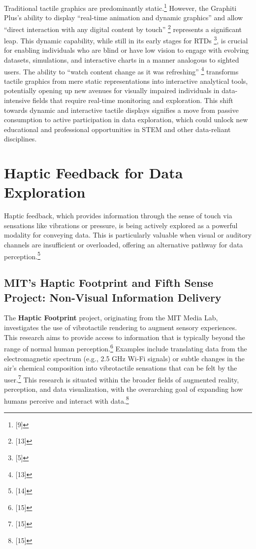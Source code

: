 Traditional tactile graphics are predominantly static.\footnote{[9]} However, the Graphiti Plus's ability to display ``real-time animation and dynamic graphics'' and allow ``direct interaction with any digital content by touch'' \footnote{[13]} represents a significant leap. This dynamic capability, while still in its early stages for RTDs \footnote{[5]}, is crucial for enabling individuals who are blind or have low vision to engage with evolving datasets, simulations, and interactive charts in a manner analogous to sighted users. The ability to ``watch content change as it was refreshing'' \footnote{[13]} transforms tactile graphics from mere static representations into interactive analytical tools, potentially opening up new avenues for visually impaired individuals in data-intensive fields that require real-time monitoring and exploration. This shift towards dynamic and interactive tactile displays signifies a move from passive consumption to active participation in data exploration, which could unlock new educational and professional opportunities in STEM and other data-reliant disciplines.

\section{Haptic Feedback for Data Exploration}
Haptic feedback, which provides information through the sense of touch via sensations like vibrations or pressure, is being actively explored as a powerful modality for conveying data. This is particularly valuable when visual or auditory channels are insufficient or overloaded, offering an alternative pathway for data perception.\footnote{[14]}

\subsection{MIT's Haptic Footprint and Fifth Sense Project: Non-Visual Information Delivery}
The \textbf{Haptic Footprint} project, originating from the MIT Media Lab, investigates the use of vibrotactile rendering to augment sensory experiences. This research aims to provide access to information that is typically beyond the range of normal human perception.\footnote{[15]} Examples include translating data from the electromagnetic spectrum (e.g., 2.5 GHz Wi-Fi signals) or subtle changes in the air's chemical composition into vibrotactile sensations that can be felt by the user.\footnote{[15]} This research is situated within the broader fields of augmented reality, perception, and data visualization, with the overarching goal of expanding how humans perceive and interact with data.\footnote{[15]}

